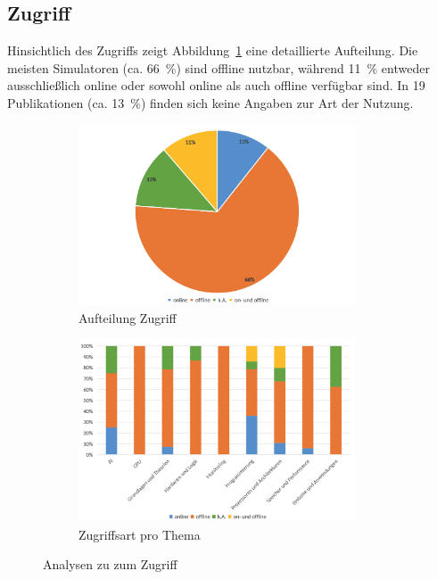 \subsection{Zugriff}

Hinsichtlich des Zugriffs zeigt Abbildung~\ref{fig:11-zugriff} eine detaillierte Aufteilung. Die meisten Simulatoren (ca. 66~\%) sind offline nutzbar, während 11~\% entweder ausschließlich online oder sowohl online als auch offline verfügbar sind. In 19 Publikationen (ca. 13~\%) finden sich keine Angaben zur Art der Nutzung.

\begin{figure}[!htbp]
    \centering
    \begin{subfigure}[b]{0.48\textwidth}
        \centering
        \includegraphics[width=0.90\textwidth]{graphics_lit/11-zugriff.png}
        \caption{Aufteilung Zugriff}
        \label{fig:11-zugriff}
    \end{subfigure}
    \hfill
    \begin{subfigure}[b]{0.48\textwidth}
        \centering
        \includegraphics[width=0.90\textwidth]{graphics_lit/13-zugriff-thema.png}
        \caption{Zugriffsart pro Thema}
        \label{fig:13-zugriff-thema}
    \end{subfigure}
    \caption{Analysen zu zum Zugriff}
    \label{fig:zugriff-analysen}
\end{figure}

